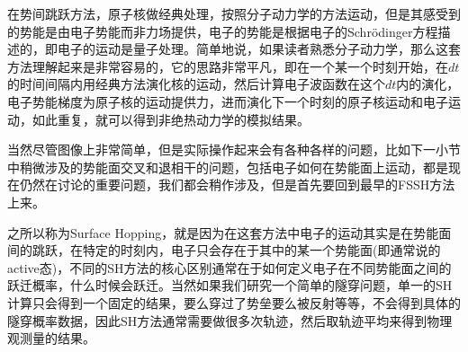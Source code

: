 \documentclass[12pt,a4paper,openany,twoside]{book}
\numberwithin{equation}{section}
\begin{document}
        在势间跳跃方法，原子核做经典处理，按照分子动力学的方法运动，但是其感受到的势能是由电子势能而非力场提供，电子的势能是根据电子的Schr\"odinger方程描述的，即电子的运动是量子处理。简单地说，如果读者熟悉分子动力学，那么这套方法理解起来是非常容易的，它的思路非常平凡，即在一个某一个时刻开始，在$dt$的时间间隔内用经典方法演化核的运动，然后计算电子波函数在这个$dt$内的演化，电子势能梯度为原子核的运动提供力，进而演化下一个时刻的原子核运动和电子运动，如此重复，就可以得到非绝热动力学的模拟结果。

        当然尽管图像上非常简单，但是实际操作起来会有各种各样的问题，比如下一小节中稍微涉及的势能面交叉和退相干的问题，包括电子如何在势能面上运动，都是现在仍然在讨论的重要问题，我们都会稍作涉及，但是首先要回到最早的FSSH方法上来。

        之所以称为Surface Hopping，就是因为在这套方法中电子的运动其实是在势能面间的跳跃，在特定的时刻内，电子只会存在于其中的某一个势能面(即通常说的active态)，不同的SH方法的核心区别通常在于如何定义电子在不同势能面之间的跃迁概率，什么时候会跃迁。当然如果我们研究一个简单的隧穿问题，单一的SH计算只会得到一个固定的结果，要么穿过了势垒要么被反射等等，不会得到具体的隧穿概率数据，因此SH方法通常需要做很多次轨迹，然后取轨迹平均来得到物理观测量的结果。
\end{document}
